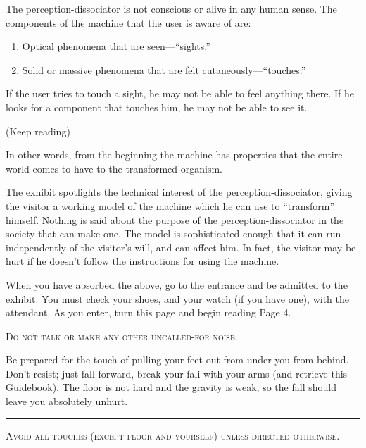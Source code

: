 The perception-dissociator is not conscious or alive in any human sense. 
The components of the machine that the user is aware of are: 
\begin{enumerate}
	\item Optical phenomena that are seen---\enquote{sights.} 
	\item Solid or \uline{massive} phenomena that are felt cutaneously---\enquote{touches.} 
\end{enumerate}
If the user tries to touch a sight, he may not be 
able to feel anything there. If he looks for a component that touches him, he 
may not be able to see it. 

\vfill

(Keep reading) 

\vfill

\clearpage


In other words, from the beginning the machine has properties that the 
entire world comes to have to the transformed organism. 

The exhibit spotlights the technical interest of the 
perception-dissociator, giving the visitor a working model of the machine 
which he can use to \enquote{transform} himself. Nothing is said about the purpose 
of the perception-dissociator in the society that can make one. The model is 
sophisticated enough that it can run independently of the visitor's will, and 
can affect him. In fact, the visitor may be hurt if he doesn't follow the 
instructions for using the machine. 


When you have absorbed the above, go to the entrance and be admitted 
to the exhibit. You must check your shoes, and your watch (if you have 
one), with the attendant. As you enter, turn this page and begin reading Page 
4. 

\clearpage

\vfill 
\textsc{Do not talk or make any other uncalled-for noise.}

\vfill 

Be prepared for the touch of pulling your feet out from under you 
from behind. Don't resist; just fall forward, break your fali with your arms 
(and retrieve this Guidebook). The floor is not hard and the gravity is weak, 
so the fall should leave you absolutely unhurt. 

\plainbreak{2}

\textsc{Avoid all touches (except floor and yourself) unless directed otherwise.}


